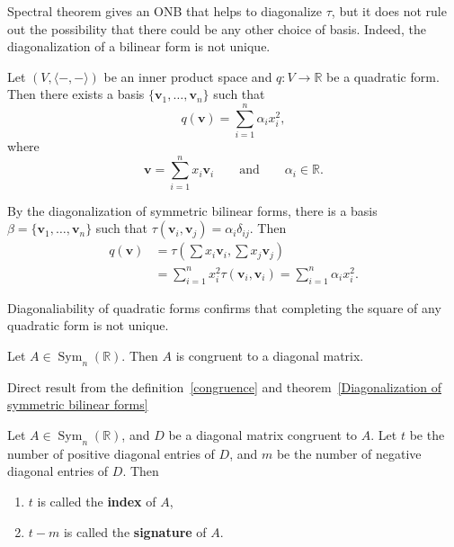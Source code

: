 \begin{remark}
    Spectral theorem gives an ONB that helps to diagonalize $\tau$, but it does not rule out the possibility that there could be any other choice of basis.
    Indeed, the diagonalization of a bilinear form is not unique.
\end{remark}


\begin{theorem}
Let $(V,\langle -,-\rangle)$ be an inner product space and $q:V\to\mathbb{R}$ be a quadratic form. Then there exists a basis $\{\mathbf{v}_1,\dots,\mathbf{v}_n\}$ such that
\[
q(\mathbf{v})
=
\sum_{i=1}^n \alpha_i x_i^2,
\]
where
\[
\mathbf{v}=\sum_{i=1}^n x_i\mathbf{v}_i
\qquad\text{and}\qquad
\alpha_i\in\mathbb{R}.
\]
\end{theorem}

\begin{pfbox}
By the diagonalization of symmetric bilinear forms, there is a basis\\
$\beta=\{\mathbf{v}_1,\dots,\mathbf{v}_n\}$ such that
$\tau(\mathbf{v}_i,\mathbf{v}_j)=\alpha_i\delta_{ij}$.
Then
\begin{align*}
q(\mathbf{v})
&=
\tau\left(\sum x_i\mathbf{v}_i,\sum x_j\mathbf{v}_j\right) \\
&=
\sum_{i=1}^n x_i^2\tau(\mathbf{v}_i,\mathbf{v}_i) = \sum_{i=1}^n \alpha_i x_i^2.
\end{align*}
\end{pfbox}

\begin{remark}
    Diagonaliability of quadratic forms confirms that completing the square of any quadratic form is not unique.
\end{remark}

\begin{theorem}
Let $A\in \operatorname{Sym}_n(\mathbb{R})$. Then $A$ is congruent to a diagonal matrix.
\end{theorem}
\begin{pfbox}
    Direct result from the definition~\eqref{congruence} and theorem~\eqref{Diagonalization of symmetric bilinear forms}
\end{pfbox}

\begin{definition}
Let $A\in \operatorname{Sym}_n(\mathbb{R})$, and $D$ be a diagonal matrix congruent to $A$.
Let $t$ be the number of positive diagonal entries of $D$, and $m$ be the number of negative diagonal entries of $D$.
Then 
\begin{enumerate}
    \item $t$ is called the \textbf{index} of $A$,
    \item $t-m$ is called the \textbf{signature} of $A$.
\end{enumerate}
\end{definition}

